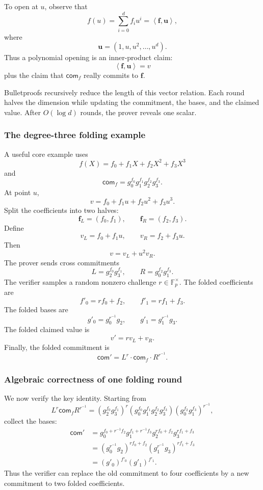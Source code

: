 \documentclass[11pt]{article}
\newcommand{\F}{\mathbb{F}}
\newcommand{\iprod}[2]{\left\langle #1,#2\right\rangle}
\begin{document}
To open at $u$, observe that
\[
    f(u)=\sum_{i=0}^{d}f_i u^i
    =\iprod{\mathbf f}{\mathbf u},
\]
where
\[
    \mathbf u=(1,u,u^2,\ldots,u^d).
\]
Thus a polynomial opening is an inner-product claim:
\[
    \iprod{\mathbf f}{\mathbf u}=v
\]
plus the claim that $\mathsf{com}_f$ really commits to $\mathbf f$.

Bulletproofs recursively reduce the length of this vector relation. Each round halves the dimension while updating the commitment, the bases, and the claimed value. After $O(\log d)$ rounds, the prover reveals one scalar.

\subsubsection{The degree-three folding example}

A useful core example uses
\[
    f(X)=f_0+f_1X+f_2X^2+f_3X^3
\]
and
\[
    \mathsf{com}_f=g_0^{f_0}g_1^{f_1}g_2^{f_2}g_3^{f_3}.
\]
At point $u$,
\[
    v=f_0+f_1u+f_2u^2+f_3u^3.
\]
Split the coefficients into two halves:
\[
    \mathbf f_L=(f_0,f_1),
    \qquad
    \mathbf f_R=(f_2,f_3).
\]
Define
\[
    v_L=f_0+f_1u,
    \qquad
    v_R=f_2+f_3u.
\]
Then
\[
    v=v_L+u^2v_R.
\]
The prover sends cross commitments
\[
    L=g_2^{f_0}g_3^{f_1},
    \qquad
    R=g_0^{f_2}g_1^{f_3}.
\]
The verifier samples a random nonzero challenge $r\in\F_p^\times$. The folded coefficients are
\[
    f'_0=rf_0+f_2,
    \qquad
    f'_1=rf_1+f_3.
\]
The folded bases are
\[
    g'_0=g_0^{r^{-1}}g_2,
    \qquad
    g'_1=g_1^{r^{-1}}g_3.
\]
The folded claimed value is
\[
    v'=rv_L+v_R.
\]
Finally, the folded commitment is
\[
    \mathsf{com}'=L^r\cdot \mathsf{com}_f\cdot R^{r^{-1}}.
\]

\subsubsection{Algebraic correctness of one folding round}

We now verify the key identity. Starting from
\[
    L^r\mathsf{com}_fR^{r^{-1}}
    =(g_2^{f_0}g_3^{f_1})^r
    (g_0^{f_0}g_1^{f_1}g_2^{f_2}g_3^{f_3})
    (g_0^{f_2}g_1^{f_3})^{r^{-1}},
\]
collect the bases:
\[
\begin{aligned}
\mathsf{com}'
&=g_0^{f_0+r^{-1}f_2}g_1^{f_1+r^{-1}f_3}g_2^{rf_0+f_2}g_3^{rf_1+f_3}\\
&=(g_0^{r^{-1}}g_2)^{rf_0+f_2}(g_1^{r^{-1}}g_3)^{rf_1+f_3}\\
&=(g'_0)^{f'_0}(g'_1)^{f'_1}.
\end{aligned}
\]
Thus the verifier can replace the old commitment to four coefficients by a new commitment to two folded coefficients.
\end{document}
